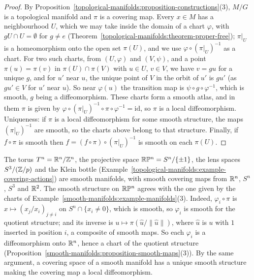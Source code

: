 \begin{proof}
By Proposition~\ref{topological-manifolds:proposition-constructions}(3), $M/G$ is a topological manifold and $\pi$ is a covering map. Every $x \in M$ has a neighbourhood $U$, which we may take inside the domain of a chart
$\varphi$, with $gU \cap U = \emptyset$ for $g \neq e$ (Theorem~\ref{topological-manifolds:theorem-proper-free}); $\pi|_U$ is a homeomorphism onto the open set $\pi(U)$, and we use $\varphi \circ (\pi|_U)^{-1}$ as a chart. For two
such charts, from $(U, \varphi)$ and $(V, \psi)$, and a point $\pi(u) = \pi(v)$ in $\pi(U) \cap \pi(V)$ with $u \in U$, $v \in V$, we have $v = gu$ for a unique $g$, and for $u'$ near $u$, the unique point of $V$ in the orbit of $u'$ is $gu'$
(as $gu' \in V$ for $u'$ near $u$). So near $\varphi(u)$ the transition map is $\psi \circ g \circ \varphi^{-1}$, which is smooth, $g$ being a diffeomorphism. These charts form a smooth atlas, and in them $\pi$ is given by
$\varphi \circ (\pi|_U)^{-1} \circ \pi \circ \varphi^{-1} = \mathrm{id}$, so $\pi$ is a local diffeomorphism. Uniqueness: if $\pi$ is a local diffeomorphism for some smooth structure, the maps $(\pi|_U)^{-1}$ are smooth, so the charts above
belong to that structure. Finally, if $f \circ \pi$ is smooth then $f = (f \circ \pi) \circ (\pi|_U)^{-1}$ is smooth on each $\pi(U)$.
\end{proof}

\begin{example}\label{smooth-manifolds:example-smooth-quotients}
The torus $T^n = \mathbb{R}^n/\mathbb{Z}^n$, the projective space $\mathbb{R}\mathbb{P}^n = S^n/\{\pm1\}$, the lens spaces $S^3/(\mathbb{Z}/p)$ and the Klein bottle
(Example~\ref{topological-manifolds:example-covering-actions}) are smooth manifolds, with smooth covering maps from $\mathbb{R}^n$, $S^n$, $S^3$ and $\mathbb{R}^2$. The smooth
structure on $\mathbb{R}\mathbb{P}^n$ agrees with the one given by the charts of Example~\ref{smooth-manifolds:example-manifolds}(3). Indeed, $\varphi_i \circ \pi$ is
$x \mapsto (x_j/x_i)_{j \neq i}$ on $S^n \cap \{x_i \neq 0\}$, which is smooth, so $\varphi_i$ is smooth for the quotient structure; and its inverse is
$u \mapsto \pi(\hat{u}/\|\hat{u}\|)$, where $\hat{u}$ is $u$ with $1$ inserted in position $i$, a composite of smooth maps. So each $\varphi_i$ is a diffeomorphism
onto $\mathbb{R}^n$, hence a chart of the quotient structure (Proposition~\ref{smooth-manifolds:proposition-smooth-maps}(3)). By the same argument, a covering space of a
smooth manifold has a unique smooth structure making the covering map a local diffeomorphism.
\end{example}

